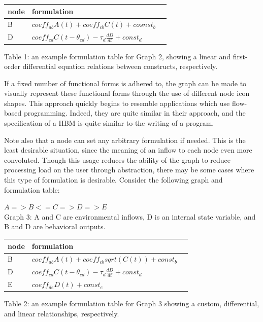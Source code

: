 \documentclass[conference]{IEEEtran}
\begin{document}
\begin{centering}
  \begin{tabular}{ | l | l | l |}
      \hline
      node & formulation \\ \hline
      B & $coeff_{ab}A(t) + coeff_{cb}C(t) + cosnst_b$  \\ \hline
      D & $coeff_{cd}C(t-\theta_{cd}) - \tau_{d}\frac{dD}{dt} + const_d$ \\ \hline
  \end{tabular}
  
  Table 1: an example formulation table for Graph 2, showing a linear and first-order differential equation relations between constructs, respectively.
\end{centering}

If a fixed number of functional forms is adhered to, the graph can be made to visually represent these functional forms through the use of different node icon shapes. 
This approach quickly begins to resemble applications which use flow-based programming. 
Indeed, they are quite similar in their approach, and the specification of a HBM is quite similar to the writing of a program.

Note also that a node can set any arbitrary formulation if needed. 
This is the least desirable situation, since the meaning of an inflow to each node even more convoluted. 
Though this usage reduces the ability of the graph to reduce processing load on the user through abstraction, there may be some cases where this type of formulation is desirable. 
Consider the following graph and formulation table:

\begin{centering}
$A => B <= C => D => E$\\
Graph 3: A and C are environmental inflows, D is an internal state variable, and B and D are behavioral outputs.
\end{centering}

\begin{centering}
  \begin{tabular}{ | l | l | l |}
      \hline
      node & formulation \\ \hline
      B & $coeff_{ab}A(t) + coeff_{cb}sqrt(C(t)) + const_b$ \\ \hline
      D & $coeff_{cd}C(t-\theta_{cd}) - \tau_{d}\frac{dD}{dt} + const_{d}$ \\ \hline
      E & $coeff_{de}D(t) + const_{e}$ \\ \hline
  \end{tabular}

  Table 2: an example formulation table for Graph 3 showing a custom, differential, and linear relationships, respectively.
\end{centering}
\end{document}
